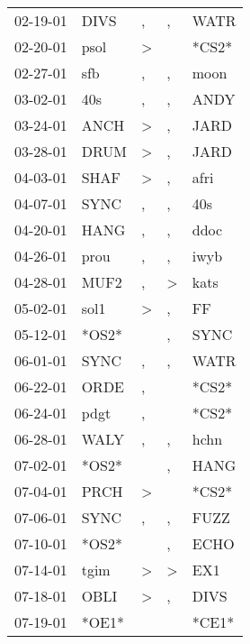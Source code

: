 \begin{supertabular}{lllll}
 02-19-01 &   DIVS &                , &                , &   WATR \\
 02-20-01 &   psol &     \textgreater &                  &  *CS2* \\
 02-27-01 &    sfb &                , &                , &   moon \\
 03-02-01 &    40s &                , &                , &   ANDY \\
 03-24-01 &   ANCH &     \textgreater &                , &   JARD \\
 03-28-01 &   DRUM &     \textgreater &                , &   JARD \\
 04-03-01 &   SHAF &     \textgreater &                , &   afri \\
 04-07-01 &   SYNC &                , &                , &    40s \\
 04-20-01 &   HANG &                , &                , &   ddoc \\
 04-26-01 &   prou &                , &                , &   iwyb \\
 04-28-01 &   MUF2 &                , &     \textgreater &   kats \\
 05-02-01 &   sol1 &     \textgreater &                , &     FF \\
 05-12-01 &  *OS2* &                  &                , &   SYNC \\
 06-01-01 &   SYNC &                , &                , &   WATR \\
 06-22-01 &   ORDE &                , &                  &  *CS2* \\
 06-24-01 &   pdgt &                , &                  &  *CS2* \\
 06-28-01 &   WALY &                , &                , &   hchn \\
 07-02-01 &  *OS2* &                  &                , &   HANG \\
 07-04-01 &   PRCH &     \textgreater &                  &  *CS2* \\
 07-06-01 &   SYNC &                , &                , &   FUZZ \\
 07-10-01 &  *OS2* &                  &                , &   ECHO \\
 07-14-01 &   tgim &     \textgreater &     \textgreater &    EX1 \\
 07-18-01 &   OBLI &     \textgreater &                , &   DIVS \\
 07-19-01 &  *OE1* &                  &                  &  *CE1* \\

\end{supertabular}

